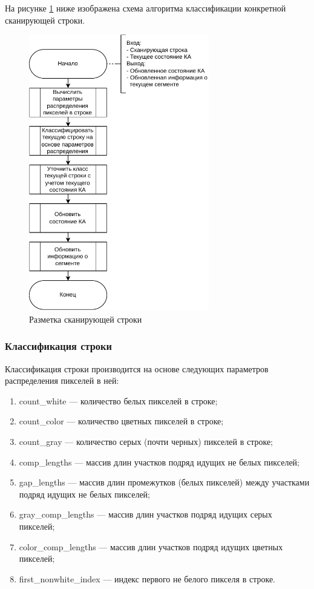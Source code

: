 \newpage

На рисунке \ref{fig:primary-markup} ниже изображена схема алгоритма классификации конкретной сканирующей строки.

\begin{figure}[H]
	\centering
	\includegraphics[width=0.7\textwidth]{diag/primary-markup.pdf}
	\caption{Разметка сканирующей строки}
	\label{fig:primary-markup}
\end{figure}

\newpage

\subsubsection*{Классификация строки}

Классификация строки производится на основе следующих параметров распределения пикселей в ней:
\begin{enumerate}
    \item count\_white --- количество белых пикселей в строке;
    \item count\_color --- количество цветных пикселей в строке;
    \item count\_gray --- количество серых (почти черных) пикселей в строке;
    \item comp\_lengths --- массив длин участков подряд идущих не белых пикселей;
    \item gap\_lengths --- массив длин промежутков (белых пикселей) между участками подряд идущих не белых пикселей;
    \item gray\_comp\_lengths --- массив длин участков подряд идущих серых пикселей;
    \item color\_comp\_lengths --- массив длин участков подряд идущих цветных пикселей;
    \item first\_nonwhite\_index --- индекс первого не белого пикселя в строке.
\end{enumerate}

